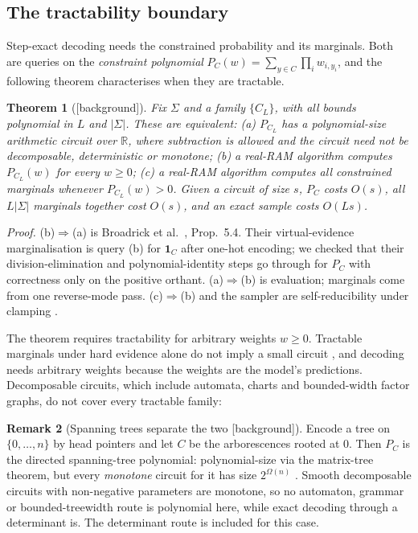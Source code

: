 \documentclass[11pt]{article}
\newtheorem{theorem}{Theorem}[section]
\theoremstyle{definition}
\newtheorem{remark}[theorem]{Remark}
\newcommand{\one}{\mathbf{1}}
\newcommand{\status}[1]{\textsf{\small[#1]}}
\newcommand{\proofref}[1]{\par\noindent\textit{Proof.} #1\par\smallskip}
\begin{document}
\subsection{The tractability boundary}
Step-exact decoding needs the constrained probability and its marginals. Both are queries on the
\emph{constraint polynomial} $P_C(w)=\sum_{y\in C}\prod_iw_{i,y_i}$, and the following theorem characterises when
they are tractable.

\begin{theorem}[\status{background}]\label{thm:char}
Fix $\Sigma$ and a family $\{C_L\}$, with all bounds polynomial in $L$ and $|\Sigma|$. These are equivalent:
(a) $P_{C_L}$ has a polynomial-size arithmetic circuit over $\mathbb R$, where subtraction is allowed and the circuit
need not be decomposable, deterministic or monotone; (b) a real-RAM algorithm computes $P_{C_L}(w)$ for every
$w\ge0$; (c) a real-RAM algorithm computes all constrained marginals whenever $P_{C_L}(w)>0$. Given a circuit of
size $s$, $P_C$ costs $O(s)$, all $L|\Sigma|$ marginals together cost $O(s)$, and an exact sample costs $O(Ls)$.
\end{theorem}
\proofref{(b)$\Rightarrow$(a) is Broadrick et al.\ \cite{broadrick2025}, Prop.~5.4. Their virtual-evidence
marginalisation is query (b) for $\one_C$ after one-hot encoding; we checked that their division-elimination and
polynomial-identity steps go through for $P_C$ with correctness only on the positive orthant. (a)$\Rightarrow$(b)
is evaluation; marginals come from one reverse-mode pass. (c)$\Rightarrow$(b) and the sampler are
self-reducibility under clamping \cite{jvv86}.}

The theorem requires tractability for arbitrary weights $w\ge0$. Tractable marginals under hard evidence alone do
not imply a small circuit \cite{broadrick2025}, and decoding needs arbitrary weights because the weights are the
model's predictions. Decomposable circuits, which include automata, charts and bounded-width factor graphs, do not
cover every tractable family:

\begin{remark}[Spanning trees separate the two \status{background}]\label{rem:arb}
Encode a tree on $\{0,\dots,n\}$ by head pointers and let $C$ be the arborescences rooted at $0$. Then $P_C$ is
the directed spanning-tree polynomial: polynomial-size via the matrix-tree theorem, but every \emph{monotone}
circuit for it has size $2^{\Omega(n)}$ \cite{jerrumsnir1982}. Smooth decomposable circuits with non-negative
parameters are monotone, so no automaton, grammar or bounded-treewidth route is polynomial here, while exact
decoding through a determinant is. The determinant route is included for this case.
\end{remark}
\end{document}
